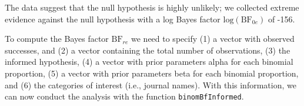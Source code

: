 \documentclass[
  english,
  man,floatsintext]{apa6}
\newenvironment{Shaded}{\begin{snugshade}}{\end{snugshade}}
\newcommand{\CommentTok}[1]{\textcolor[rgb]{0.56,0.35,0.01}{\textit{#1}}}
\newcommand{\DataTypeTok}[1]{\textcolor[rgb]{0.13,0.29,0.53}{#1}}
\newcommand{\DecValTok}[1]{\textcolor[rgb]{0.00,0.00,0.81}{#1}}
\newcommand{\KeywordTok}[1]{\textcolor[rgb]{0.13,0.29,0.53}{\textbf{#1}}}
\newcommand{\NormalTok}[1]{#1}
\newcommand{\OperatorTok}[1]{\textcolor[rgb]{0.81,0.36,0.00}{\textbf{#1}}}
\newcommand{\StringTok}[1]{\textcolor[rgb]{0.31,0.60,0.02}{#1}}
\begin{document}
\begin{Shaded}
\end{Shaded}

The data suggest that the null hypothesis is highly unlikely; we collected extreme evidence against the null hypothesis with a log Bayes factor \(\text{log}(\text{BF}_{0e})\) of -156.

To compute the Bayes factor \(\text{BF}_{re}\) we need to specify (1) a vector with observed successes, and (2) a vector containing the total number of observations, (3) the informed hypothesis, (4) a vector with prior parameters alpha for each binomial proportion, (5) a vector with prior parameters beta for each binomial proportion, and (6) the categories of interest (i.e., journal names). With this information, we can now conduct the analysis with the function \texttt{binomBfInformed}.
\end{document}

